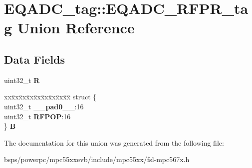 \hypertarget{unionEQADC__tag_1_1EQADC__RFPR__tag}{}\section{E\+Q\+A\+D\+C\+\_\+tag\+::E\+Q\+A\+D\+C\+\_\+\+R\+F\+P\+R\+\_\+tag Union Reference}
\label{unionEQADC__tag_1_1EQADC__RFPR__tag}
\subsection*{Data Fields}
\begin{DoxyCompactItemize}
\item 
\mbox{\label{unionEQADC__tag_1_1EQADC__RFPR__tag_a5ba77ff50645425129476a28671e2f2a}} 
uint32\+\_\+t {\bfseries R}
\item 
\mbox{\label{unionEQADC__tag_1_1EQADC__RFPR__tag_a7722ef0f5c2ffc9dcde0c35de279e4ab}} 
\begin{tabbing}
xx\=xx\=xx\=xx\=xx\=xx\=xx\=xx\=xx\=\kill
struct \{\\
\>uint32\_t {\bfseries \_\_pad0\_\_}:16\\
\>uint32\_t {\bfseries RFPOP}:16\\
\} {\bfseries B}\\

\end{tabbing}\end{DoxyCompactItemize}


The documentation for this union was generated from the following file\+:\begin{DoxyCompactItemize}
\item 
bsps/powerpc/mpc55xxevb/include/mpc55xx/fsl-\/mpc567x.\+h\end{DoxyCompactItemize}
